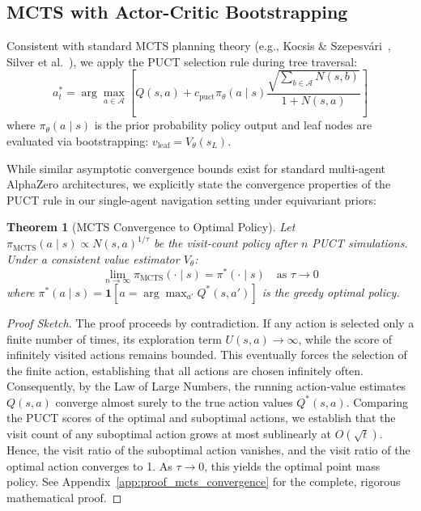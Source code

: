 \documentclass{article}
\newtheorem{theorem}{Theorem}[section]
\begin{document}
\subsection{MCTS with Actor-Critic Bootstrapping}

Consistent with standard MCTS planning theory (e.g., Kocsis \& Szepesv{\'a}ri~\cite{kocsis2006bandit}, Silver et al.~\cite{silver2017mastering}), we apply the PUCT selection rule during tree traversal:
\begin{equation}
    a_t^* = \arg\max_{a \in \mathcal{A}} \left[ Q(s, a) + c_{\mathrm{puct}} \pi_\theta(a \mid s) \frac{\sqrt{\sum_{b \in \mathcal{A}} N(s, b)}}{1 + N(s, a)} \right]
\end{equation}
where $\pi_\theta(a \mid s)$ is the prior probability policy output and leaf nodes are evaluated via bootstrapping: $v_{\mathrm{leaf}} = V_\theta(s_L)$.

While similar asymptotic convergence bounds exist for standard multi-agent AlphaZero architectures, we explicitly state the convergence properties of the PUCT rule in our single-agent navigation setting under equivariant priors:
\begin{theorem}[MCTS Convergence to Optimal Policy]\label{thm:mcts_convergence}
Let $\pi_{\mathrm{MCTS}}(a \mid s) \propto N(s, a)^{1/\tau}$ be the visit-count policy after $n$ PUCT simulations. Under a consistent value estimator $V_\theta$:
\begin{equation}
    \lim_{n \to \infty} \pi_{\mathrm{MCTS}}(\cdot \mid s) = \pi^*(\cdot \mid s) \quad \text{as } \tau \to 0
\end{equation}
where $\pi^*(a \mid s) = \mathbf{1}[a = \arg\max_{a'} Q^*(s, a')]$ is the greedy optimal policy.
\end{theorem}

\begin{proof}[Proof Sketch]
The proof proceeds by contradiction. If any action is selected only a finite number of times, its exploration term $U(s,a) \to \infty$, while the score of infinitely visited actions remains bounded. This eventually forces the selection of the finite action, establishing that all actions are chosen infinitely often. Consequently, by the Law of Large Numbers, the running action-value estimates $Q(s, a)$ converge almost surely to the true action values $Q^*(s, a)$. Comparing the PUCT scores of the optimal and suboptimal actions, we establish that the visit count of any suboptimal action grows at most sublinearly at $O(\sqrt{t})$. Hence, the visit ratio of the suboptimal action vanishes, and the visit ratio of the optimal action converges to 1. As $\tau \to 0$, this yields the optimal point mass policy. See Appendix~\ref{app:proof_mcts_convergence} for the complete, rigorous mathematical proof.
\end{proof}
\end{document}
